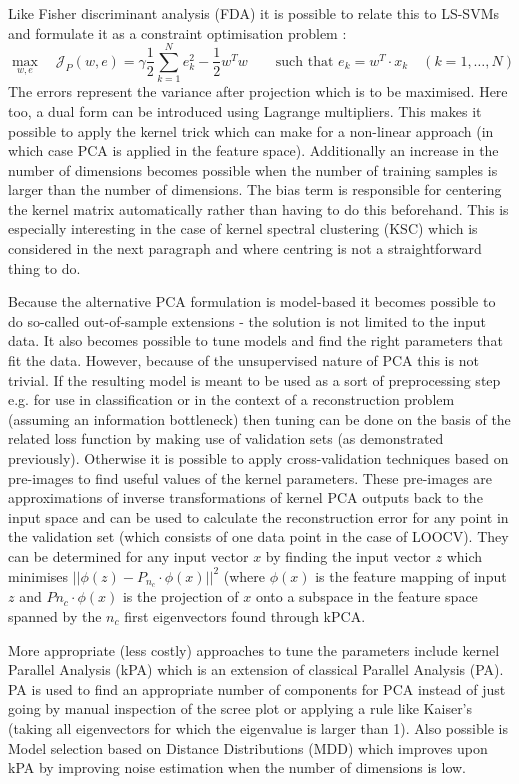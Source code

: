 \par Like Fisher discriminant analysis (FDA) it is possible to relate this to LS-SVMs and formulate it as a constraint optimisation problem :
$$\max_{w,e}\quad\mathcal{J}_P(w,e)=\gamma\frac{1}{2}\sum_{k=1}^Ne_k^2-\frac{1}{2}w^Tw\qquad\text{such that $e_k=w^T\cdot x_k\quad(k=1,\dots, N)$}$$
The errors represent the variance after projection which is to be maximised. Here too, a dual form can be introduced using Lagrange multipliers. This makes it possible to apply the kernel trick which can make for a non-linear approach (in which case PCA is applied in the feature space). Additionally an increase in the number of dimensions becomes possible when the number of training samples is larger than the number of dimensions. The bias term is responsible for centering the kernel matrix automatically rather than having to do this beforehand. This is especially interesting in the case of kernel spectral clustering (KSC) which is considered in the next paragraph and where centring is not a straightforward thing to do.

\par Because the alternative PCA formulation is model-based it becomes possible to do so-called out-of-sample extensions - the solution is not limited to the input data. It also becomes possible to tune models and find the right parameters that fit the data. However, because of the unsupervised nature of PCA this is not trivial. If the resulting model is meant to be used as a sort of preprocessing step e.g. for use in classification or in the context of a reconstruction problem (assuming an information bottleneck) then tuning can be done on the basis of the related loss function by making use of validation sets (as demonstrated previously). Otherwise it is possible to apply cross-validation techniques based on pre-images to find useful values of the kernel parameters. These pre-images are approximations of inverse transformations of kernel PCA outputs back to the input space and can be used to calculate the reconstruction error for any point in the validation set (which consists of one data point in the case of LOOCV). They can be determined for any input vector $x$ by finding the input vector $z$ which minimises $||\phi(z)-P_{n_c}\cdot \phi(x)||^2$ (where $\phi(x)$ is the feature mapping of input $z$ and $P{n_c}\cdot\phi(x)$ is the projection of $x$ onto a subspace in the feature space spanned by the $n_c$ first eigenvectors found through kPCA.

\par More appropriate (less costly) approaches to tune the parameters include kernel Parallel Analysis (kPA) which is an extension of classical Parallel Analysis (PA). PA is used to find an appropriate number of components for PCA instead of just going by manual inspection of the scree plot or applying a rule like Kaiser's (taking all eigenvectors for which the eigenvalue is larger than 1). Also possible is Model selection based on Distance Distributions (MDD) which improves upon kPA by improving noise estimation when the number of dimensions is low.

